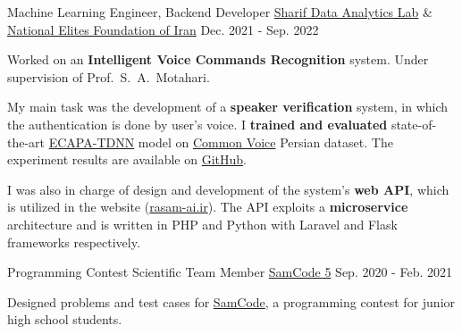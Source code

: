 \begin{cventries}
  \cventry
    {Machine Learning Engineer, Backend Developer} %
    {\href{https://www.sharif.edu/}{Sharif Data Analytics Lab} \& \href{https://en.bmn.ir/}{National Elites Foundation of Iran}} %
    {} %
    {Dec. 2021 - Sep. 2022} %
    {
      \begin{cvitems} %
        \item {Worked on an \textbf{Intelligent Voice Commands Recognition} system. Under supervision of Prof.~S.~A.~Motahari.}
        \item {My main task was the development of a \textbf{speaker verification} system, in which the authentication is done by user's voice. I \textbf{trained and evaluated} state-of-the-art \href{https://arxiv.org/abs/2005.07143}{ECAPA-TDNN} model on \href{https://commonvoice.mozilla.org}{Common Voice} Persian dataset. The experiment results are available on \href{https://github.com/radinshayanfar/speaker-verification}{GitHub}.}
        \item{I was also in charge of design and development of the system's \textbf{web API}, which is utilized in the website (\href{https://rasam-ai.ir/}{rasam-ai.ir}). The API exploits a \textbf{microservice} architecture and is written in PHP and Python with Laravel and Flask frameworks respectively.}
      \end{cvitems}
    }

  \cventry
    {Programming Contest Scientific Team Member} %
    {\href{https://samcode.allamehelli3.ir/staff.html}{SamCode 5}} %
    {} %
    {Sep. 2020 - Feb. 2021} %
    {
      \begin{cvitems} %
        \item {Designed problems and test cases for {\href{https://samcode.allamehelli3.ir/}{SamCode}}, a programming contest for junior high school students.}
      \end{cvitems}
    }

\end{cventries}


